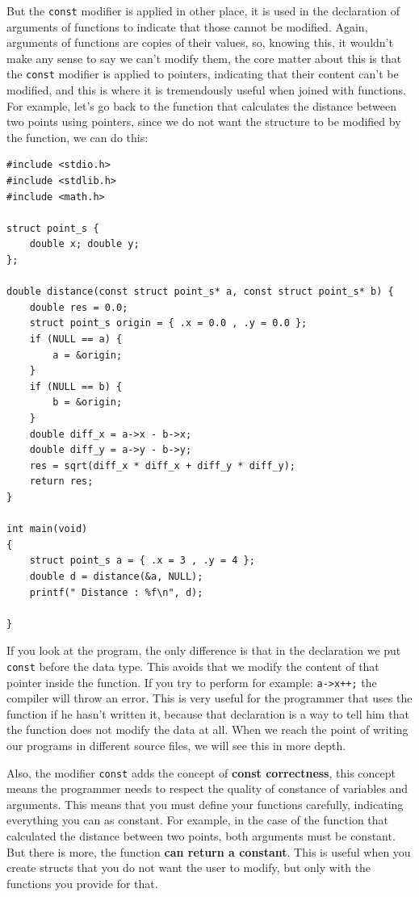 \documentclass[a4paper]{article}
\begin{document}
But the \verb!const! modifier is applied in other place, it is used in the
declaration of arguments of functions to indicate that those cannot be modified.
Again, arguments of functions are copies of their values, so, knowing this,
it wouldn't make any sense to say we can't modify them, the core matter about
this is that the \verb"const" modifier is applied to pointers, indicating that
their content can't be modified, and this is where it is tremendously useful
when joined with functions. For example, let's go back to the function that
calculates the distance between two points using pointers, since we do not want
the structure to be modified by the function, we can do this:

\noindent
\begin{minipage}[H]{\linewidth}
\mbox{}
\begin{lstlisting}[style=C,
caption={Uso de punteros constantes como argumentos de función},
label={lst:constantArguments}]
#include <stdio.h>
#include <stdlib.h>
#include <math.h>

struct point_s {
    double x; double y;
};

double distance(const struct point_s* a, const struct point_s* b) {
    double res = 0.0;
    struct point_s origin = { .x = 0.0 , .y = 0.0 };
    if (NULL == a) {
        a = &origin;
    }
    if (NULL == b) {
        b = &origin;
    }
    double diff_x = a->x - b->x;
    double diff_y = a->y - b->y;
    res = sqrt(diff_x * diff_x + diff_y * diff_y);
    return res;
}

int main(void)
{
    struct point_s a = { .x = 3 , .y = 4 };
    double d = distance(&a, NULL);
    printf(" Distance : %f\n", d);

}
\end{lstlisting}
\end{minipage}

If you look at the program, the only difference is that in the declaration we
put \verb!const! before the data type. This avoids that we modify the content
of that pointer inside the function. If you try to perform for example:
\verb!a->x++;! the compiler will throw an error. This is very useful for the
programmer that uses the function if he hasn't written it, because that
declaration is a way to tell him that the function does not modify the data at
all. When we reach the point of writing our programs in different source files,
we will see this in more depth.

Also, the modifier \verb!const! adds the concept of \textbf{const correctness},
this concept means the programmer needs to respect the quality of constance of
variables and arguments. This means that you must define your functions
carefully, indicating everything you can as constant. For example, in the
case of the function that calculated the distance between two points, both
arguments must be constant. But there is more, the function \textbf{can return a
constant}. This is useful when you create structs that you do not want the user
to modify, but only with the functions you provide for that.
\end{document}

